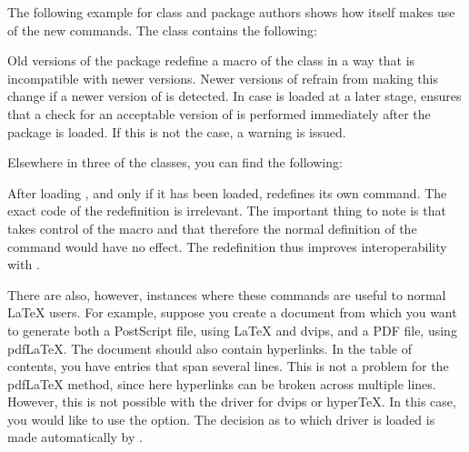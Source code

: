\begin{Example}
  The following example for class and package authors shows how \KOMAScript{}
  itself makes use of the new commands. The class  contains the
  following:
\begin{lstcode}
\end{lstcode}
  Old versions of the  package redefine a macro of the
   class in a way that is incompatible with newer \KOMAScript{}
  versions. Newer versions of  refrain from making this
  change if a newer version of \KOMAScript{} is detected. In case
   is loaded at a later stage,  ensures that
  a check for an acceptable version of  is performed
  immediately after the package is loaded. If this is not the case, a warning
  is issued.

  Elsewhere in three of the \KOMAScript{} classes, you can find the following:
\begin{lstcode}
  \AfterPackage{caption2}{%
    \renewcommand*{\setcapindent}{%
\end{lstcode}
  After loading , and only if it has been loaded,
  \KOMAScript{} redefines its own  command.
  The exact code of the redefinition is irrelevant. The important thing to
  note is that  takes control of the
   macro and that therefore the normal definition
  of the  command would have no effect. The
  redefinition thus improves interoperability with .

  There are also, however, instances where these commands are useful to normal
  \LaTeX{} users. For example, suppose you create a document from which you
  want to generate both a PostScript file, using \LaTeX{} and dvips, and a PDF
  file, using \mbox{pdf{\LaTeX}}. The document should also contain hyperlinks.
  In the table of contents, you have entries that span several lines. This is
  not a problem for the \mbox{pdf{\LaTeX}} method, since here hyperlinks can
  be broken across multiple lines.  However, this is not possible with the
   driver for dvips or \mbox{hyper{\TeX}}. In this case, you
  would like  to use the  option. The
  decision as to which driver is loaded is made automatically by
  .
  

\end{Example}
